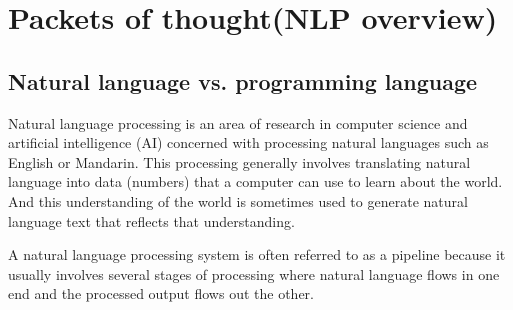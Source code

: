 \chapter{Packets of thought(NLP overview)\label{Ch01}}
\section{Natural language vs. programming language}
\begin{definition}
    Natural language processing is an area of research in computer science and artificial intelligence (AI) concerned with processing natural languages such as English or Mandarin. This processing generally involves
    translating natural language into data (numbers) that a computer can use to
    learn about the world. And this understanding of the world is sometimes used
    to generate natural language text that reflects that understanding.
\end{definition}

\begin{definition}
    A natural language processing system is often referred to as a
    pipeline because it usually involves several stages of processing where natural
    language flows in one end and the processed output flows out the other.
\end{definition}

